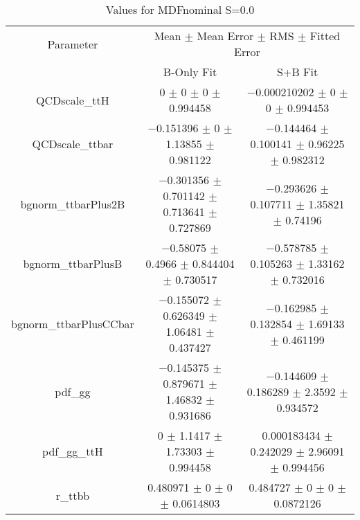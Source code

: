 \begin{table}
\centering
\caption{Values for MDFnominal S=0.0}
\begin{tabular}{ccc}
\toprule
Parameter & \multicolumn{2}{c}{Mean $\pm$ Mean Error $\pm$ RMS $\pm$ Fitted Error}\\
 & B-Only Fit & S+B Fit\\
\midrule
QCDscale\_ttH & \num{0} $\pm$ \num{0} $\pm$ \num{0} $\pm$ \num{0.994458} & \num{-0.000210202} $\pm$ \num{0} $\pm$ \num{0} $\pm$ \num{0.994453}\\
QCDscale\_ttbar & \num{-0.151396} $\pm$ \num{0} $\pm$ \num{1.13855} $\pm$ \num{0.981122} & \num{-0.144464} $\pm$ \num{0.100141} $\pm$ \num{0.96225} $\pm$ \num{0.982312}\\
bgnorm\_ttbarPlus2B & \num{-0.301356} $\pm$ \num{0.701142} $\pm$ \num{0.713641} $\pm$ \num{0.727869} & \num{-0.293626} $\pm$ \num{0.107711} $\pm$ \num{1.35821} $\pm$ \num{0.74196}\\
bgnorm\_ttbarPlusB & \num{-0.58075} $\pm$ \num{0.4966} $\pm$ \num{0.844404} $\pm$ \num{0.730517} & \num{-0.578785} $\pm$ \num{0.105263} $\pm$ \num{1.33162} $\pm$ \num{0.732016}\\
bgnorm\_ttbarPlusCCbar & \num{-0.155072} $\pm$ \num{0.626349} $\pm$ \num{1.06481} $\pm$ \num{0.437427} & \num{-0.162985} $\pm$ \num{0.132854} $\pm$ \num{1.69133} $\pm$ \num{0.461199}\\
pdf\_gg & \num{-0.145375} $\pm$ \num{0.879671} $\pm$ \num{1.46832} $\pm$ \num{0.931686} & \num{-0.144609} $\pm$ \num{0.186289} $\pm$ \num{2.3592} $\pm$ \num{0.934572}\\
pdf\_gg\_ttH & \num{0} $\pm$ \num{1.1417} $\pm$ \num{1.73303} $\pm$ \num{0.994458} & \num{0.000183434} $\pm$ \num{0.242029} $\pm$ \num{2.96091} $\pm$ \num{0.994456}\\
r\_ttbb & \num{0.480971} $\pm$ \num{0} $\pm$ \num{0} $\pm$ \num{0.0614803} & \num{0.484727} $\pm$ \num{0} $\pm$ \num{0} $\pm$ \num{0.0872126}\\
\bottomrule
\end{tabular}
\end{table}